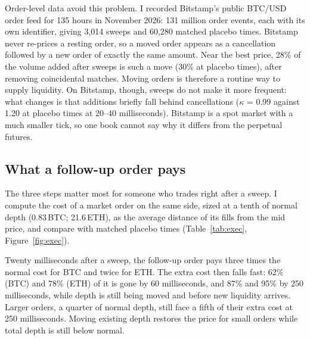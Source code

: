 \documentclass[12pt]{article}
\newcommand{\tabnote}[1]{\par\vspace{2pt}{\footnotesize\singlespacing\noindent #1\par}\vspace{6pt}}
\begin{document}
Order-level data avoid this problem. I recorded Bitstamp's public BTC/USD order feed for 135
hours in November 2026: 131 million order events, each with its own identifier, giving 3{,}014
sweeps and 60{,}280 matched placebo times. Bitstamp never re-prices a resting order, so a moved
order appears as a cancellation followed by a new order of exactly the same amount. Near the
best price, 28\% of the volume added after sweeps is such a move (30\% at placebo times), after
removing coincidental matches. Moving orders is therefore a routine way to supply liquidity.
On Bitstamp, though, sweeps do not make it more frequent: what changes is that additions briefly
fall behind cancellations ($\kappa$ = 0.99 against 1.20 at placebo times at 20--40
milliseconds). Bitstamp is a spot market with a much smaller tick, so one book cannot say why it
differs from the perpetual futures.

\subsection{What a follow-up order pays}
\label{sec:exec}
The three steps matter most for someone who trades right after a sweep. I compute the cost of a
market order on the same side, sized at a tenth of normal depth (0.83\,BTC; 21.6\,ETH), as the
average distance of its fills from the mid price, and compare with matched placebo times
(Table~\ref{tab:exec}, Figure~\ref{fig:exec}).

Twenty milliseconds after a sweep, the follow-up order pays three times the normal cost for BTC
and twice for ETH. The extra cost then falls fast: 62\% (BTC) and 78\% (ETH) of it is gone by 60
milliseconds, and 87\% and 95\% by 250 milliseconds, while depth is still being moved and before
new liquidity arrives. Larger orders, a quarter of normal depth, still face a fifth of their
extra cost at 250 milliseconds. Moving existing depth restores the price for small orders while
total depth is still below normal.

\begin{table}[t]
\centering
\caption{Cost of a follow-up market order}
\tabnote{Swept-side market order of 0.1 $\times$ median placebo depth within 50 ticks, cost in bps
from the mid at delay $\tau$. Volume beyond 50 ticks is charged at 51 ticks, so costs are lower
bounds. Excess = sweep $-$ matched placebo, with 95\% day-cluster bootstrap intervals; Left =
excess relative to its 20\,ms value.}
\label{tab:exec}
\resizebox{\textwidth}{!}{}
\end{table}
\end{document}
